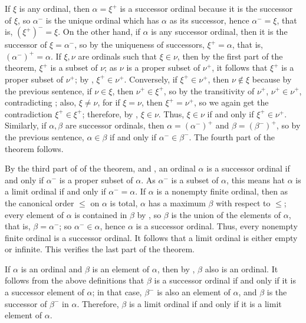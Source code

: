 \documentclass{article}
\begin{document}
If \(\xi\) is any ordinal, then \(\alpha = \xi^+\) is a successor
ordinal because it is the successor of \(\xi\), so \(\alpha^-\) is the
unique ordinal which has \(\alpha\) as its successor, hence
\(\alpha^- = \xi\), that is, \((\xi^+)^- = \xi\).  On the other hand,
if \(\alpha\) is any successor ordinal, then it is the successor of
\(\xi = \alpha^-\), so by the uniqueness of successors,
\(\xi^+ = \alpha\), that is, \((\alpha^-)^+ = \alpha\).  If
\(\xi, \nu\) are ordinals such that \(\xi \in \nu\), then by the first
part of the theorem, \(\xi^+\) is a subset of \(\nu\); as \(\nu\) is a
proper subset of \(\nu^+\), it follows that \(\xi^+\) is a proper
subset of \(\nu^+\); by , \(\xi^+ \in \nu^+\).
Conversely, if \(\xi^+ \in \nu^+\), then \(\nu \notin \xi\) because by
the previous sentence, if \(\nu \in \xi\), then \(\nu^+ \in \xi^+\),
so by the transitivity of \(\nu^+\), \(\nu^+ \in \nu^+\),
contradicting ; also, \(\xi \neq \nu\), for if
\(\xi = \nu\), then \(\xi^+ = \nu^+\), so we again get the
contradiction \(\xi^+ \in \xi^+\); therefore, by ,
\(\xi \in \nu\).  Thus, \(\xi \in \nu\) if and only if
\(\xi^+ \in \nu^+\).  Similarly, if \(\alpha, \beta\) are successor
ordinals, then \(\alpha = (\alpha^-)^+\) and \(\beta = (\beta^-)^+\),
so by the previous sentence, \(\alpha \in \beta\) if and only if
\(\alpha^- \in \beta^-\).  The fourth part of the theorem follows.

By the third part of of the theorem, and , an
ordinal \(\alpha\) is a successor ordinal if and only if \(\alpha^-\)
is a proper subset of \(\alpha\).  As \(\alpha^-\) is a subset of
\(\alpha\), this means hat \(\alpha\) is a limit ordinal if and only
if \(\alpha^- = \alpha\).  If \(\alpha\) is a nonempty finite ordinal,
then as the canonical order \(\leq\) on \(\alpha\) is total,
\(\alpha\) has a maximum \(\beta\) with respect to \(\leq\); every
element of \(\alpha\) is contained in \(\beta\) by
, so \(\beta\) is the union of the elements of
\(\alpha\), that is, \(\beta = \alpha^-\); so \(\alpha^- \in \alpha\),
hence \(\alpha\) is a successor ordinal.  Thus, every nonempty finite
ordinal is a successor ordinal.  It follows that a limit ordinal is
either empty or infinite.  This verifies the last part of the theorem.

If \(\alpha\) is an ordinal and \(\beta\) is an element of \(\alpha\),
then by , \(\beta\) also is an ordinal.  It follows
from the above definitions that \(\beta\) is a successor ordinal if
and only if it is a successor element of \(\alpha\); in that case,
\(\beta^-\) is also an element of \(\alpha\), and \(\beta\) is the
successor of \(\beta^-\) in \(\alpha\).  Therefore, \(\beta\) is a
limit ordinal if and only if it is a limit element of \(\alpha\).
\end{document}
